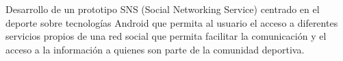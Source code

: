 Desarrollo de un prototipo SNS (Social Networking Service) centrado en el deporte sobre tecnologías Android que permita al usuario el acceso a diferentes servicios propios de una red social que permita facilitar la comunicación y el acceso a la información a quienes son parte de la comunidad deportiva.
